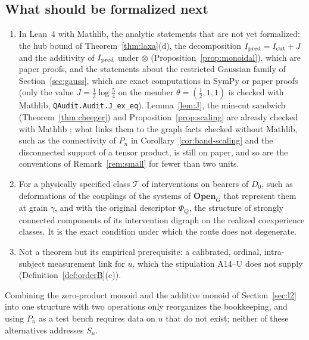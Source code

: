 \subsection{What should be formalized next}\label{sec:next}
\begin{enumerate}
\item[(i)] In Lean~4 with Mathlib, the analytic statements that are not yet formalized: the hub bound of Theorem~\ref{thm:laxa}(d), the decomposition $I_{\rm pred}=I_{\rm cut}+J$ and the additivity of $I_{\rm pred}$ under $\otimes$ (Proposition~\ref{prop:monoidal}), which are paper proofs, and the statements about the restricted Gaussian family of Section~\ref{sec:gauss}, which are exact computations in SymPy or paper proofs (only the value $J=\tfrac12\log\tfrac54$ on the member $\theta=(\tfrac12,1,1)$ is checked with Mathlib, \texttt{QAudit.Audit.J\_ex\_eq}). Lemma~\ref{lem:J}, the min-cut sandwich (Theorem~\ref{thm:cheeger}) and Proposition~\ref{prop:scaling} are already checked with Mathlib \stM; what links them to the graph facts checked without Mathlib, such as the connectivity of $P_n$ in Corollary~\ref{cor:band-scaling} and the disconnected support of a tensor product, is still on paper, and so are the conventions of Remark~\ref{rem:small} for fewer than two units.
\item[(ii)] For a physically specified class $\mathcal T$ of interventions on bearers of $D_0$, such as deformations of the couplings of the systems of $\mathbf{Open}_G$ that represent them at grain $\gamma$, and with the original descriptor $\Phi_Q$, the structure of strongly connected components of its intervention digraph on the realized coexperience classes. It is the exact condition under which the route does not degenerate.
\item[(iii)] Not a theorem but its empirical prerequisite: a calibrated, ordinal, intra-subject measurement link for $u$, which the stipulation A14--U does not supply (Definition~\ref{def:orderB}(c)).
\end{enumerate}
Combining the zero-product monoid and the additive monoid of Section~\ref{sec:l2} into one structure with two operations only reorganizes the bookkeeping, and using $P_n$ as a test bench requires data on $u$ that do not exist; neither of these alternatives addresses $S_u$.
